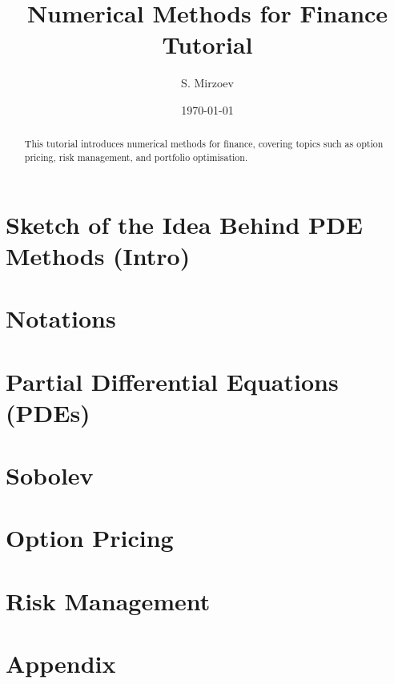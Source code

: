 \documentclass{article}
\title{Numerical Methods for Finance Tutorial}
\author{S. Mirzoev}
\date{\today}
\begin{document}
\maketitle

\begin{abstract}
This tutorial introduces numerical methods for finance, covering topics such as option pricing, risk management, and portfolio optimisation.
\end{abstract}

\section{Sketch of the Idea Behind PDE Methods (Intro)}


\section{Notations}


\section{Partial Differential Equations (PDEs)}


\section{Sobolev}
% 

\section{Option Pricing}
% 

\section{Risk Management}
% 


\section{Appendix}

\end{document}
